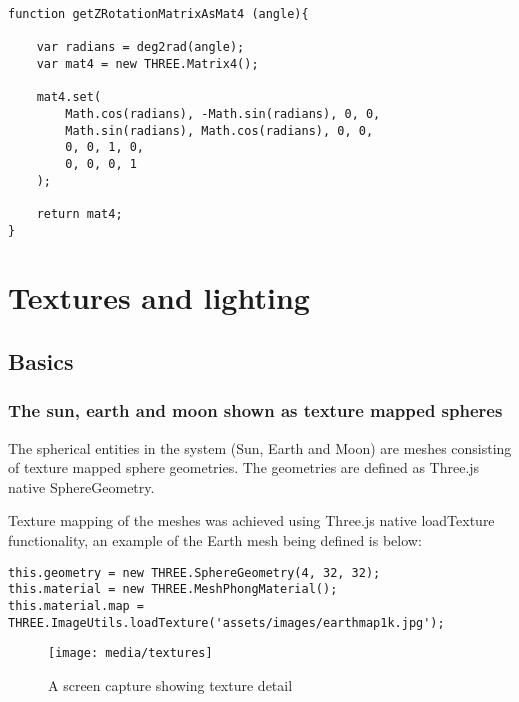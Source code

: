 \documentclass[titlepage]{article}
\begin{document}
\begin{lstlisting}[caption=Definition of a rotation matrix in the Z axis. Can be found in MatrixUtils.js]
function getZRotationMatrixAsMat4 (angle){

    var radians = deg2rad(angle);
    var mat4 = new THREE.Matrix4();
    
    mat4.set(
        Math.cos(radians), -Math.sin(radians), 0, 0,
        Math.sin(radians), Math.cos(radians), 0, 0,
        0, 0, 1, 0,
        0, 0, 0, 1
    );
    
    return mat4;
}

\end{lstlisting}


\section{Textures and lighting}

\subsection{Basics}
\subsubsection{The sun, earth and moon shown as texture mapped spheres}

The spherical entities in the system (Sun, Earth and Moon) are meshes consisting of texture mapped sphere geometries. The geometries are defined as Three.js native SphereGeometry.

Texture mapping of the meshes was achieved using Three.js native loadTexture functionality, an example of the Earth mesh being defined is below:
\begin{lstlisting}[caption=Above code can be found in sun.js]
this.geometry = new THREE.SphereGeometry(4, 32, 32);
this.material = new THREE.MeshPhongMaterial();
this.material.map = THREE.ImageUtils.loadTexture('assets/images/earthmap1k.jpg');
\end{lstlisting}

\begin{figure}[h!]
                \centering
                \texttt{[image: media/textures]}
                \caption{A screen capture showing texture detail}
\end{figure}
\end{document}
